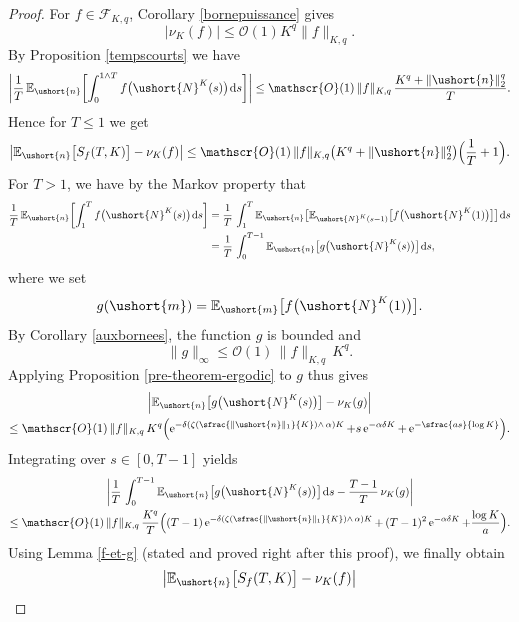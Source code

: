\documentclass[JEP,XML,SOM,Unicode]{cedram}
\newcommand{\Psfrac}[2]{(\sfrac{#1}{#2})}
\newcommand{\scaleto}[2]{#1}
\let\mathcal\mathscr
\numberwithin{equation}{section}
\theoremstyle{plain}
\theoremstyle{definition}
\newcommand{\E}{{\mathbb{E}}}
\newcommand{\Oun}{\mathcal{O}(1)}
\newcommand{\sK}{K}
\newcommand{\vecn}{\ushort{n}}
\newcommand{\vecm}{\ushort{m}}
\newcommand{\leproc}{\ushort{N}^{K}}
\newcommand{\sleproc}{\ushort{N}^{K}}
\newcommand{\nuk}{\nu_{K}}\let\snuk\nuk
\newcommand{\e}{\operatorname{e}}
\newcommand{\dd}{\hspace{1pt}\mathrm{d}}
\newcommand{\normdeux}[1]{\|#1\|_{2}}\let\snormdeux\normdeux
\begin{document}
\begin{proof}
For $f\in\mathscr{F}\!_{\sK,q}$, Corollary \ref{bornepuissance} gives
\[
\big|\nuk(f)\big| \leq \Oun K^q \|f\|_{\sK,q}.
\]
By Proposition \ref{tempscourts} we have
\[
\biggl|\frac{1}{T}\,\E_{\vecn}
\biggl[\int_{0}^{1\wedge T}f\bigl(\leproc(s)\bigr)\dd s\biggr]\biggr|\le \Oun\, \|f\|_{\sK,q}\, \frac{K^{q}+\normdeux{\vecn}^{\scaleto{q}{3.6pt}}}{T}.
\]
Hence for $T\le 1$ we get
\[
\left|\E_{\vecn}\bigl[S_{f}(T,K)\bigr]-\nuk(f)\right|\le \Oun\, \|f\|_{\sK,q}\bigl(K^{q}
+\normdeux{\vecn}^{\scaleto{q}{3.6pt}}\bigr)
\Bigl(\frac{1}{T}+1\Bigr).
\]
For $T>1$, we have by the Markov property that
\begin{align*}
\frac{1}{T}\,\E_{\vecn}\biggl[\int_{1}^{T}
f\bigl(\leproc(s)\bigr)\dd s\biggr]
&=\frac{1}{T}\,\int_{1}^{T}\E_{\vecn}\bigl[\E_{\sleproc(s-1)}\bigl[f\bigl(\leproc(1)\bigr)\bigr]\bigr]\dd s\\
& =\frac{1}{T}\,\int_{0}^{T-1}\E_{\vecn}\bigl[g\bigl(\leproc(s)\bigr)\bigr]\dd s,
\end{align*}
where we set
\begin{equation}\label{def-g}
g(\vecm)=\E_{\vecm}\bigl[f\bigl(\leproc(1)\bigr)\bigr].
\end{equation}
By Corollary \ref{auxbornees}, the function $g$ is bounded and
\begin{equation}\label{ginfini}
\|g\|_{\infty}\le \Oun\, \|f\|_{\sK,q}\,K^{q}.
\end{equation}
Applying Proposition \ref{pre-theorem-ergodic} to $g$ thus gives
\begin{multline*}
\left|\E_{\vecn}\bigl[g\bigl(\leproc(s)\bigr)\bigr]-\nuk(g)\right|\\
\le \Oun\, \|f\|_{\sK,q}\, K^q \Bigl(\e^{-\delta\left(\zeta\Psfrac{\|\vecn\|_{1}}{K}\wedge\,\alpha\right)K}
+s\e^{-\alpha\delta K}+\e^{-\sfrac{a s}{\log K}}\Bigr).
\end{multline*}
Integrating over $s\in [0,T-1]$ yields
\begin{multline*}
\biggl| \frac{1}{T}\,\int_{0}^{T-1}\E_{\vecn}\bigl[g\bigl(\leproc(s)\bigr)\bigr]\dd s - \frac{T-1}{T}\, \nuk(g)\biggr|\\
\leq \Oun\, \|f\|_{\sK,q} \,\frac{K^q}{T}\Bigl((T-1)\e^{-\delta\left(\zeta\Psfrac{\|\vecn\|_{1}}{K}\wedge\,\alpha\right)K}
+\,(T-1)^2\e^{-\alpha\delta K}+\frac{\log K}{a}\Bigr).
\end{multline*}
Using Lemma \ref{f-et-g} (stated and proved right after this proof), we finally obtain
\begin{align*}
\bigl|\E_{\vecn}\bigl[&S_{f}(T,K)\bigr]-\nuk(f)\bigr|\\

\end{align*}
\end{proof}
\end{document}

